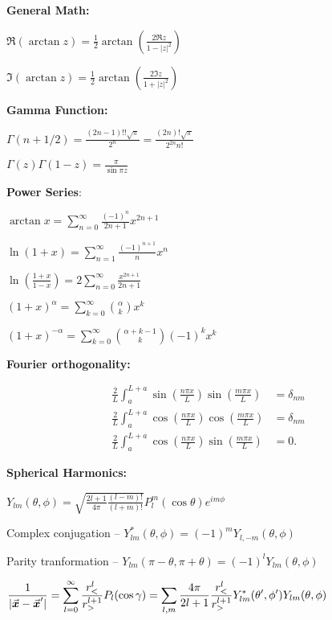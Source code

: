 \def\duedate{\today}
\def\HWnum{2}




\textbf{General Math:}

$\displaystyle \Re( \arctan{z} ) = \frac{1}{2} \arctan( \frac{2\Re{z}}{1 - |z|^2} )$

$\displaystyle \Im( \arctan{z} ) = \frac{1}{2} \arctan( \frac{2\Im{z}}{1 + |z|^2} )$

\textbf{Gamma Function:}

$\displaystyle \Gamma(n + 1/2) = \frac{(2n-1)!! \sqrt{\pi}}{2^{n}} = \frac{(2n)! \sqrt{\pi}}{2^{2n} n!}$

$\displaystyle \Gamma(z) \Gamma(1-z) = \frac{\pi}{\sin{\pi z}}$

\textbf{Power Series}:

$\displaystyle \arctan{x} = \sum_{n=0}^{\infty} \frac{(-1)^{n}}{2n+1} x^{2n+1}$

$\displaystyle \ln(1 + x) = \sum_{n=1}^{\infty} \frac{(-1)^{n+1}}{n} x^{n}$

$\displaystyle \ln(\frac{1+x}{1-x}) = 2\sum_{n=0}^{\infty} \frac{x^{2n+1}}{2n+1}$

$\displaystyle (1+x)^{\alpha} = \sum_{k=0}^{\infty} \binom{\alpha}{k} x^{k}$

$\displaystyle (1+x)^{-\alpha} = \sum_{k=0}^{\infty} \binom{\alpha + k - 1}{k} (-1)^{k} x^{k}$

\textbf{Fourier orthogonality:}

\begin{align}
    \frac{2}{L}\int_{a}^{L+a} \sin(\frac{n \pi x}{L}) \sin(\frac{m \pi x}{L}) &= \delta_{nm} \\
    \frac{2}{L} \int_{a}^{L+a} \cos(\frac{n \pi x}{L}) \cos(\frac{m \pi x}{L}) &= \delta_{nm} \\
    \frac{2}{L} \int_{a}^{L+a} \cos(\frac{n \pi x}{L}) \sin(\frac{m \pi x}{L}) &= 0
.\end{align}

\textbf{Spherical Harmonics:}

$\displaystyle Y_{lm}(\theta,\phi) = \sqrt{\frac{2l+1}{4\pi} \frac{(l-m)!}{(l+m)!}} P_{l}^{m}(\cos{\theta}) e^{im\phi}$

Complex conjugation -- $Y_{lm}^{*}(\theta,\phi) = (-1)^{m} Y_{l,-m}(\theta,\phi)$

Parity tranformation -- $Y_{lm}(\pi - \theta,\pi + \theta) = (-1)^{l} Y_{lm}(\theta,\phi)$

$\displaystyle \frac{1}{|\va*{x} - \va*{x}'|} = \sum_{l=0}^{\infty} \frac{r_{<}^{l}}{r_{>}^{l+1}} P_{l}(\cos{\gamma}) = \sum_{l,m} \frac{4\pi}{2l+1} \frac{r_{<}^{l}}{r_{>}^{l+1}} Y_{lm}^{*}(\theta',\phi') Y_{lm}(\theta,\phi)$

